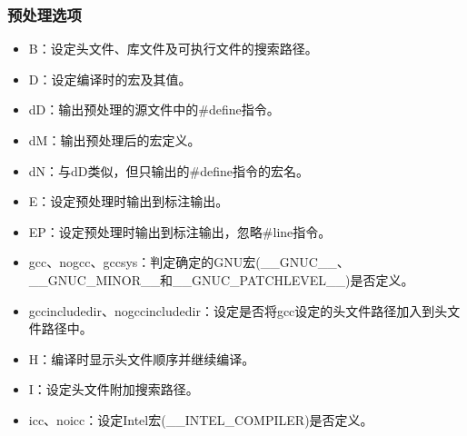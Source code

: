 \documentclass[a4paper,12pt,english]{sphinxmanual}
\begin{document}
\subsubsection{预处理选项}
\label{\detokenize{compiler/intel:id9}}\begin{itemize}
\item {} 
\sphinxAtStartPar
\sphinxhyphen{}B：设定头文件、库文件及可执行文件的搜索路径。

\item {} 
\sphinxAtStartPar
\sphinxhyphen{}D：设定编译时的宏及其值。

\item {} 
\sphinxAtStartPar
\sphinxhyphen{}dD：输出预处理的源文件中的\#define指令。

\item {} 
\sphinxAtStartPar
\sphinxhyphen{}dM：输出预处理后的宏定义。

\item {} 
\sphinxAtStartPar
\sphinxhyphen{}dN：与\sphinxhyphen{}dD类似，但只输出的\#define指令的宏名。

\item {} 
\sphinxAtStartPar
\sphinxhyphen{}E：设定预处理时输出到标注输出。

\item {} 
\sphinxAtStartPar
\sphinxhyphen{}EP：设定预处理时输出到标注输出，忽略\#line指令。

\item {} 
\sphinxAtStartPar
\sphinxhyphen{}gcc、\sphinxhyphen{}no\sphinxhyphen{}gcc、\sphinxhyphen{}gcc\sphinxhyphen{}sys：判定确定的GNU宏(\_\_GNUC\_\_、\_\_GNUC\_MINOR\_\_和\_\_GNUC\_PATCHLEVEL\_\_)是否定义。

\item {} 
\sphinxAtStartPar
\sphinxhyphen{}gcc\sphinxhyphen{}include\sphinxhyphen{}dir、\sphinxhyphen{}no\sphinxhyphen{}gcc\sphinxhyphen{}include\sphinxhyphen{}dir：设定是否将gcc设定的头文件路径加入到头文件路径中。

\item {} 
\sphinxAtStartPar
\sphinxhyphen{}H：编译时显示头文件顺序并继续编译。

\item {} 
\sphinxAtStartPar
\sphinxhyphen{}I：设定头文件附加搜索路径。

\item {} 
\sphinxAtStartPar
\sphinxhyphen{}icc、\sphinxhyphen{}no\sphinxhyphen{}icc：设定Intel宏(\_\_INTEL\_COMPILER)是否定义。


\end{itemize}
\end{document}
